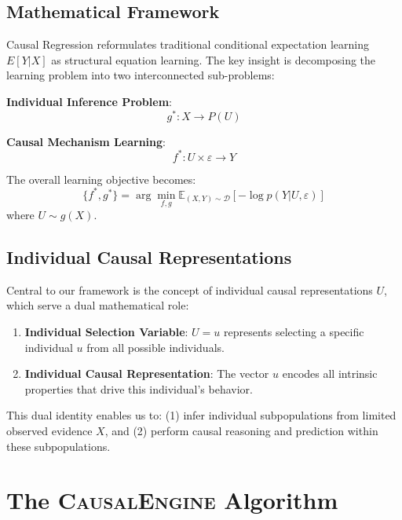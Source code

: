 \documentclass[letterpaper]{article} %
\newcommand{\causalengine}{\textsc{CausalEngine}}
\begin{document}
\subsection{Mathematical Framework}

Causal Regression reformulates traditional conditional expectation learning $E[Y|X]$ as structural equation learning. The key insight is decomposing the learning problem into two interconnected sub-problems:

\textbf{Individual Inference Problem}:
\begin{equation}
g^*: X \rightarrow P(U)
\end{equation}

\textbf{Causal Mechanism Learning}:
\begin{equation}
f^*: U \times \varepsilon \rightarrow Y  
\end{equation}

The overall learning objective becomes:
\begin{equation}
\{f^*, g^*\} = \arg\min_{f,g} \mathbb{E}_{(X,Y) \sim \mathcal{D}}[-\log p(Y|U,\varepsilon)]
\end{equation}
where $U \sim g(X)$.

\subsection{Individual Causal Representations}

Central to our framework is the concept of individual causal representations $U$, which serve a dual mathematical role:

\begin{enumerate}
\item \textbf{Individual Selection Variable}: $U = u$ represents selecting a specific individual $u$ from all possible individuals.
\item \textbf{Individual Causal Representation}: The vector $u$ encodes all intrinsic properties that drive this individual's behavior.
\end{enumerate}

This dual identity enables us to: (1) infer individual subpopulations from limited observed evidence $X$, and (2) perform causal reasoning and prediction within these subpopulations.

\section{The \causalengine{} Algorithm}
\end{document}
